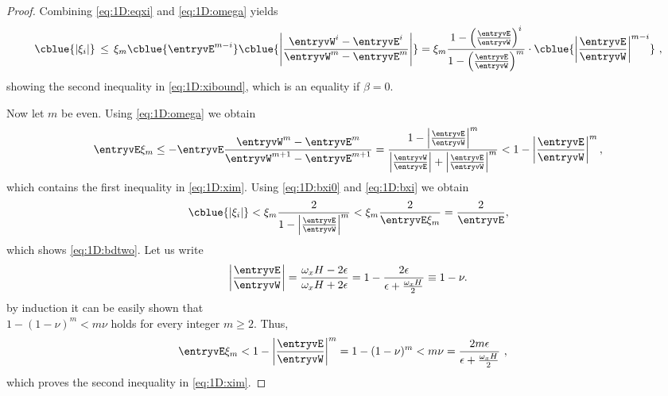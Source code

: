 \begin{proof}
Combining \eqref{eq:1D:eqxi} and \eqref{eq:1D:omega} yields
%
\begin{equation}\label{eq:1D:bxi0}
\cblue{\left| \xi_{i} \right|}
 \, \leq \, \xi_{m}\cblue{\entryvE^{m-i}} \cblue{\left|\frac{\entryvW^{i}-\entryvE^{i}}{\entryvW^{m}-\entryvE^{m}}\right|}=
 \xi_{m}\frac{1-\left(\frac{\entryvE}{\entryvW}\right)^{i}}{1-\left(\frac{\entryvE}{\entryvW}\right)^{m}} \cdot\cblue{\left|\frac{\entryvE}{\entryvW}\right|^{m-i}}~,
\end{equation}
%
showing the second inequality in \eqref{eq:1D:xibound}, which is an equality if
$\beta=0$.


Now let $m$ be even.
%
%
Using \eqref{eq:1D:omega} we obtain
%
\begin{equation}\label{eq:1D:bxi}
 \entryvE\xi_{m}	\leq	-\entryvE\frac{\entryvW^{m}-\entryvE^{m}}{\entryvW^{m+1}-\entryvE^{m+1}}=
 \frac{1-\left|\frac{\entryvE}{\entryvW}\right|^{m}}{\left|\frac{\entryvW}{\entryvE}\right|+\left|\frac{\entryvE}{\entryvW}\right|^{m}}
<1-\left|\frac{\entryvE}{\entryvW}\right|^{m},
\end{equation}
%
which contains the first inequality in \eqref{eq:1D:xim}. Using \eqref{eq:1D:bxi0}
and \eqref{eq:1D:bxi} we obtain
%
$$\cblue{\left|\xi_{i}\right|} <
 \xi_{m}\frac{2}{1-\left|\frac{\entryvE}{\entryvW}\right|^{m}}
 <  \xi_{m}\frac{2}{ \entryvE\xi_{m}} = \frac{2}{ \entryvE},$$
%
which shows \eqref{eq:1D:bdtwo}. Let us write
%
$$\left|\frac{\entryvE}{\entryvW}\right|	=
\frac{\omega_x H-2\epsilon}{\omega_x H+2\epsilon}=
1 - \frac{2\epsilon}{\epsilon+\frac{\omega_x H}{2}}\equiv 1 - \nu.$$
%
 by induction it
can be easily shown that\\ $1 - (1-\nu)^m < m\nu$ holds for every integer
$m\geq 2$. Thus,
%
\begin{align*}%
 \entryvE\xi_{m}	&<	1-\left|\frac{\entryvE}{\entryvW}\right|^{m}
 = 1 - (1-\nu)^m < m\nu
 =\frac{2m\epsilon}{\epsilon+\frac{\omega_x H}{2}} ~,
\end{align*}
%
which proves the second inequality in \eqref{eq:1D:xim}.
%
%
%
\end{proof}



